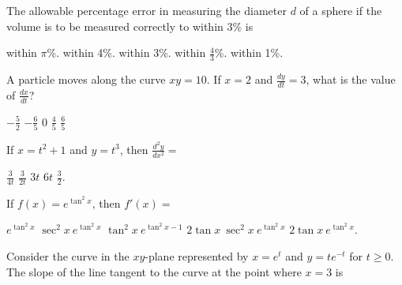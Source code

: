 \begin{questions}
\question[2]  The allowable percentage error in measuring the diameter
    $d$ of a sphere if the volume is to be measured correctly to
    within 3\% is

    \begin{oneparchoices}
    \choice within $\pi$\%.
    \choice within 4\%.
    \choice within 3\%.
    \choice within $\frac{4}{3}$\%.
    \CorrectChoice within 1\%.
    \end{oneparchoices}

\question[2] A particle moves along the curve $xy = 10$. If $x = 2$
    and $\frac{dy}{dt} = 3$, what is the value of $\frac{dx}{dt}$?
    
    \begin{oneparchoices}
    \choice $-\frac{5}{2}$
    \CorrectChoice $-\frac{6}{5}$
    \choice $0$
    \choice $\frac{4}{5}$
    \choice $\frac{6}{5}$
    \end{oneparchoices}


\question[2] If $x = t^2 + 1$ and $y = t^3$, then $\frac{d^2y}{dx^2} = $

    \begin{oneparchoices}
    \CorrectChoice $\frac{3}{4t}$
    \choice $\frac{3}{2t}$
    \choice $3t$
    \choice $6t$
    \choice $\frac{3}{2}$.
    \end{oneparchoices}

\question[2] If $f(x) = e^{\tan^2 x}$, then $f'(x) = $

    \begin{oneparchoices}
    \choice $e^{\tan^2 x}$
    \choice $\sec^2 x\ e^{\tan^2 x}$
    \choice $\tan^2 x\ e^{\tan^2 x - 1}$
    \CorrectChoice $2\tan x\ \sec^2 x\ e^{\tan^2 x}$
    \choice $2\tan x\ e^{\tan^2 x}$.
    \end{oneparchoices}

\question[2] Consider the curve in the $xy$-plane represented by $x =
    e^t$ and $y = te^{-t}$ for $t \ge 0$. The slope of the line
    tangent to the curve at the point where $x = 3$ is

    \begin{oneparchoices}
    \end{oneparchoices}


\end{questions}
